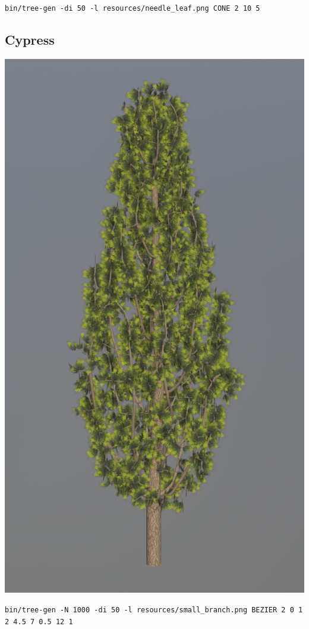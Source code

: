 \documentclass[10pt,a4paper]{article}
\begin{document}
\texttt{bin/tree-gen -di 50 -l resources/needle\_leaf.png CONE 2 10 5}

\subsection{Cypress}

\begin{centering}
\includegraphics[scale=.28]{cypress.png}
\end{centering}

\texttt{bin/tree-gen -N 1000 -di 50 -l resources/small\_branch.png BEZIER 2 0 1 2 4.5 7 0.5 12 1}
\end{document}
